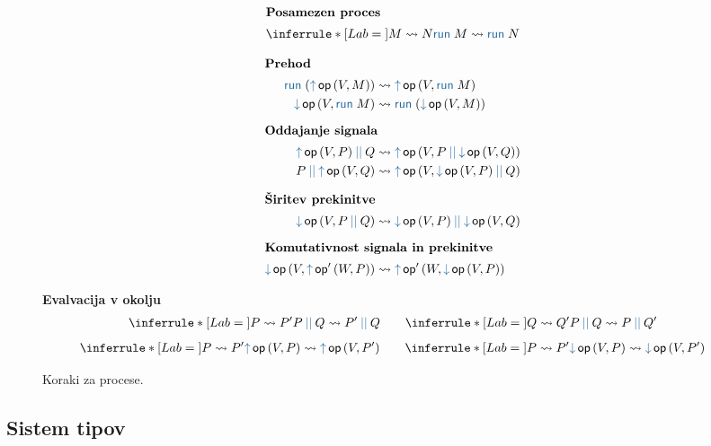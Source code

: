 \begin{figure}[H]
    \centering
	\small
	\begin{minipage}[t]{0.4\textwidth}
		\centering
		\begin{align*}
		\intertext{\textbf{Posamezen proces}}
		\coopinfer{}{
			M \reduces N
		}{
			\tmrun M \reduces \tmrun N
		}
		\end{align*}
	\end{minipage}
	\qquad
	\begin{align*}
	\intertext{\textbf{Prehod}}
	\tmrun {(\tmopout{op}{V}{M})}  &\reduces \tmopout{op}{V}{\tmrun M}
	\\
	\tmopin{op}{V}{\tmrun M} &\reduces \tmrun {(\tmopin{op}{V}{M})}
	\\[1ex]
	\intertext{\textbf{Oddajanje signala}}
	\tmpar{\tmopout{op}{V}{P}}{Q} &\reduces \tmopout{op}{V}{\tmpar{P}{\tmopin{op}{V}{Q}}}
	\\
	\tmpar{P}{\tmopout{op}{V}{Q}} &\reduces \tmopout{op}{V}{\tmpar{\tmopin{op}{V}{P}}{Q}}
	\\[1ex]
	\intertext{\textbf{Širitev prekinitve}}
	\tmopin{op}{V}{\tmpar P Q} &\reduces \tmpar {\tmopin{op}{V}{P}} {\tmopin{op}{V}{Q}}
	\\[1ex]
	\intertext{\textbf{Komutativnost signala in prekinitve}}
	\tmopin{op}{V}{\tmopout{op'}{W}{P}} &\reduces \tmopout{op'}{W}{\tmopin{op}{V}{P}}
	\end{align*}
	
	\textbf{Evalvacija v okolju}
	\begin{align*}
	\coopinfer{}{
		P \reduces P'
	}{
		\tmpar{P}{Q}  \reduces \tmpar{P'}{Q}
	}
	\qquad
	\coopinfer{}{
		Q \reduces Q'
	}{
		\tmpar{P}{Q}  \reduces \tmpar{P}{Q'}
	}
	\end{align*}
\vspace{-4ex}
	\begin{align*}
		\coopinfer{}{
			P \reduces P'
		}{
			\tmopout{op}{V}{P}  \reduces \tmopout{op}{V}{P'}
		}
		\qquad
		\coopinfer{}{
			P \reduces P'
		}{
			\tmopin{op}{V}{P}  \reduces \tmopin{op}{V}{P'}
		}
	\end{align*}
	
	\caption{Koraki za procese.}
	\label{fig:small-step-semantics-of-processes}
\end{figure}



\subsection{Sistem tipov}

